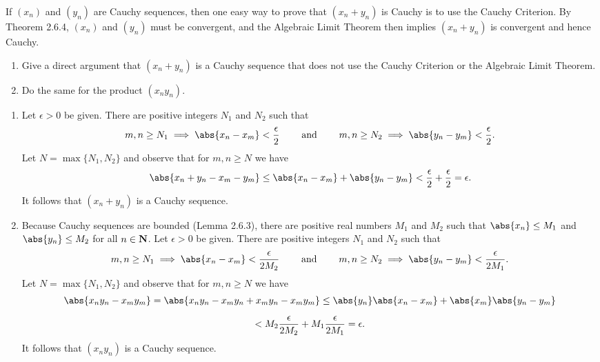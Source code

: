 \documentclass{lew98_solutions}
\begin{document}
\begin{exercise}
\label{ex:2.6.3}
    If \( (x_n) \) and \( (y_n) \) are Cauchy sequences, then one easy way to prove that \( (x_n + y_n) \) is Cauchy is to use the Cauchy Criterion. By Theorem 2.6.4, \( (x_n) \) and \( (y_n) \) must be convergent, and the Algebraic Limit Theorem then implies \( (x_n + y_n) \) is convergent and hence Cauchy.
    \begin{enumerate}
        \item Give a direct argument that \( (x_n + y_n) \) is a Cauchy sequence that does not use the Cauchy Criterion or the Algebraic Limit Theorem.

        \item Do the same for the product \( (x_n y_n) \).
    \end{enumerate}
\end{exercise}

\begin{solution}
    \begin{enumerate}
        \item Let \( \epsilon > 0 \) be given. There are positive integers \( N_1 \) and \( N_2 \) such that
        \[
            m, n \geq N_1 \implies \abs{x_n - x_m} < \frac{\epsilon}{2} \hspaceand m, n \geq N_2 \implies \abs{y_n - y_m} < \frac{\epsilon}{2}.
        \]
        Let \( N = \max \{ N_1, N_2 \} \) and observe that for \( m, n \geq N \) we have
        \[
            \abs{x_n + y_n - x_m - y_m} \leq \abs{x_n - x_m} + \abs{y_n - y_m} < \frac{\epsilon}{2} + \frac{\epsilon}{2} = \epsilon.
        \]
        It follows that \( (x_n + y_n) \) is a Cauchy sequence.

        \item Because Cauchy sequences are bounded (Lemma 2.6.3), there are positive real numbers \( M_1 \) and \( M_2 \) such that \( \abs{x_n} \leq M_1 \) and \( \abs{y_n} \leq M_2 \) for all \( n \in \mathbf{N} \). Let \( \epsilon > 0 \) be given. There are positive integers \( N_1 \) and \( N_2 \) such that
        \[
            m, n \geq N_1 \implies \abs{x_n - x_m} < \frac{\epsilon}{2 M_2} \hspaceand m, n \geq N_2 \implies \abs{y_n - y_m} < \frac{\epsilon}{2 M_1}.
        \]
        Let \( N = \max \{ N_1, N_2 \} \) and observe that for \( m, n \geq N \) we have
        \begin{multline*}
            \abs{x_n y_n - x_m y_m} = \abs{x_n y_n - x_m y_n + x_m y_n - x_m y_m} \leq \abs{y_n} \abs{x_n - x_m} + \abs{x_m} \abs{y_n - y_m} \\[2mm]
            < M_2 \frac{\epsilon}{2 M_2} + M_1 \frac{\epsilon}{2 M_1} = \epsilon.
        \end{multline*}
        It follows that \( (x_n y_n) \) is a Cauchy sequence.
    \end{enumerate}
\end{solution}
\end{document}
